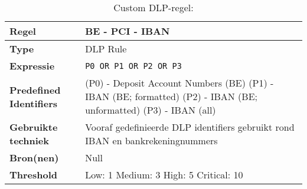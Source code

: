 \begin{table}[h]
    \centering
    \small
    \scriptsize
    \begin{tabular}{p{4cm} p{10cm}}
        \toprule
        \textbf{Regel} & BE - PCI - IBAN \\
        \midrule
        \textbf{Type} & DLP Rule \\
        \textbf{Expressie} & \texttt{P0 OR P1 OR P2 OR P3 } \\
        \textbf{Predefined Identifiers} & 
        (P0) - Deposit Account Numbers (BE)
        (P1) - IBAN (BE; formatted)
        (P2) - IBAN (BE; unformatted)
        (P3) - IBAN (all) \\
        \textbf{Gebruikte techniek} & Vooraf gedefinieerde DLP identifiers gebruikt rond IBAN en bankrekeningnummers \\
        \textbf{Bron(nen)} & Null \\
        \textbf{Threshold} & Low: 1 \quad Medium: 3 \quad High: 5 \quad Critical: 10 \\
        \bottomrule
    \end{tabular}
    \caption{Custom DLP-regel: }
    \label{tab:custom-be-iban}
\end{table}


